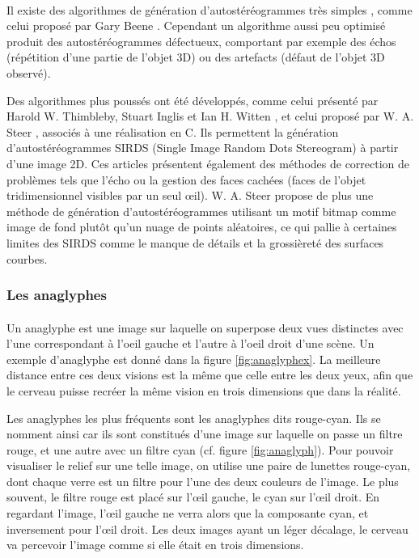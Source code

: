 \paragraph{}
Il existe des algorithmes de génération d’autostéréogrammes très simples , comme celui proposé par Gary Beene \cite{garybeene}. Cependant un algorithme aussi peu optimisé produit des autostéréogrammes défectueux, comportant par exemple des échos (répétition d'une partie de l'objet 3D) ou des artefacts (défaut de l'objet 3D observé).

Des algorithmes plus poussés ont été développés, comme celui présenté par Harold W. Thimbleby, Stuart Inglis et Ian H. Witten \cite{stereogram}, et celui proposé par W. A. Steer \cite{wasteer}, associés à une réalisation en C. Ils permettent la génération d’autostéréogrammes SIRDS (Single Image Random Dots Stereogram) à partir d’une image 2D. Ces articles présentent également des méthodes de correction de problèmes tels que l'écho ou la gestion des faces cachées (faces de l'objet tridimensionnel visibles par un seul œil). W. A. Steer propose de plus une méthode de génération d'autostéréogrammes utilisant un motif bitmap comme image de fond plutôt qu'un nuage de points aléatoires, ce qui pallie à certaines limites des SIRDS comme le manque de détails et la grossièreté des surfaces courbes.

\subsubsection{Les anaglyphes}

\paragraph{}
	Un anaglyphe est une image sur laquelle on superpose deux vues distinctes avec l'une correspondant à l'oeil gauche et l'autre à l'oeil droit d’une scène. Un exemple d'anaglyphe est donné dans la figure \ref{fig:anaglyphex}. La meilleure distance entre ces deux visions est la même que celle entre les deux yeux, afin que le cerveau puisse recréer la même vision en trois dimensions que dans la réalité.

	Les anaglyphes les plus fréquents sont les anaglyphes dits rouge-cyan. Ils se nomment ainsi car ils sont constitués d’une image sur laquelle on passe un filtre rouge, et une autre avec un filtre cyan (cf. figure \ref{fig:anaglyph}). Pour pouvoir visualiser le relief sur une telle image, on utilise une paire de lunettes rouge-cyan, dont chaque verre est un filtre pour l’une des deux couleurs de l’image. Le plus souvent, le filtre rouge est placé sur l’œil gauche, le cyan sur l’œil droit. En regardant l’image, l’œil gauche ne verra alors que la composante cyan, et inversement pour l’œil droit. Les deux images ayant un léger décalage, le cerveau va percevoir l’image comme si elle était en trois dimensions. 
	
